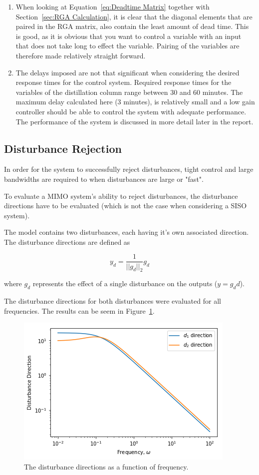 \begin{enumerate}
	\item When looking at Equation~\ref{eq:Deadtime Matrix} together with Section~\ref{sec:RGA Calculation}, it is clear that the diagonal elements that are paired in the RGA matrix, also contain the least amount of dead time. This is good, as it is obvious that you want to control a variable with an input that does not take long to effect the variable. Pairing of the variables are therefore made relatively straight forward.
	\item The delays imposed are not that significant when considering the desired response times for the control system. Required response times for the variables of the distillation column range between 30 and 60 minutes. The maximum delay calculated here (3 minutes), is relatively small and a low gain controller should be able to control the system with adequate performance. The performance of the system is discussed in more detail later in the report.
\end{enumerate}

\subsection{Disturbance Rejection}

In order for the system to successfully reject disturbances, tight control and large bandwidths are required to when disturbances are large or "fast". 

To evaluate a MIMO system's ability to reject disturbances, the disturbance directions have to be evaluated (which is not the case when considering a SISO system). 

The model contains two disturbances, each having it's own associated direction. The disturbance directions are defined as

\begin{equation}
	y_d = \frac{1}{||g_d||_2}g_d
\end{equation}

where $g_d$ represents the effect of a single disturbance on the outputs ($y = g_dd$).

The disturbance directions for both disturbances were evaluated for all frequencies. The results can be seem in Figure~\ref{fig:disturbance-direction}.

\begin{figure}[H]
	\centering
	\includegraphics[width=0.7\linewidth]{"Figures/Disturbance Direction"}
	\caption{The disturbance directions as a function of frequency.}
	\label{fig:disturbance-direction}
\end{figure}

